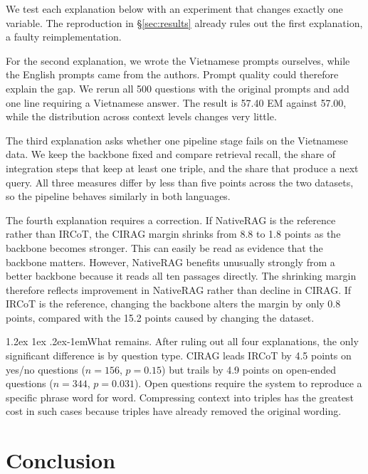 \documentclass[11pt]{article}
\makeatletter
\renewcommand\paragraph{\@startsection{paragraph}{4}{\z@}%
  {1.2ex \@plus1ex \@minus.2ex}{-1em}{\normalfont\normalsize\bfseries}}
\makeatother
\begin{document}
We test each explanation below with an experiment that changes exactly one variable. The
reproduction in \S\ref{sec:results} already rules out the first explanation, a faulty
reimplementation.

For the second explanation, we wrote the Vietnamese prompts ourselves, while the English
prompts came from the authors. Prompt quality could therefore explain the gap. We rerun all
500 questions with the original prompts and add one line requiring a Vietnamese answer. The
result is 57.40 EM against 57.00, while the distribution across context levels changes very
little.

The third explanation asks whether one pipeline stage fails on the Vietnamese data. We keep
the backbone fixed and compare retrieval recall, the share of integration steps that keep at
least one triple, and the share that produce a next query. All three measures differ by less
than five points across the two datasets, so the pipeline behaves similarly in both
languages.

The fourth explanation requires a correction. If NativeRAG is the reference rather than
IRCoT, the CIRAG margin shrinks from 8.8 to 1.8 points as the backbone becomes stronger. This
can easily be read as evidence that the backbone matters. However, NativeRAG benefits
unusually strongly from a better backbone because it reads all ten passages directly. The
shrinking margin therefore reflects improvement in NativeRAG rather than decline in CIRAG.
If IRCoT is the reference, changing the backbone alters the margin by only 0.8 points,
compared with the 15.2 points caused by changing the dataset.


\paragraph{What remains.} After ruling out all four explanations, the only significant
difference is by question type. CIRAG leads IRCoT by 4.5 points on yes/no questions
($n = 156$, $p = 0.15$) but trails by 4.9 points on open-ended questions ($n = 344$,
$p = 0.031$). Open questions require the system to reproduce a specific phrase word for
word. Compressing context into triples has the greatest cost in such cases because triples
have already removed the original wording.

\section{Conclusion}
\label{sec:conclusion}
\end{document}
